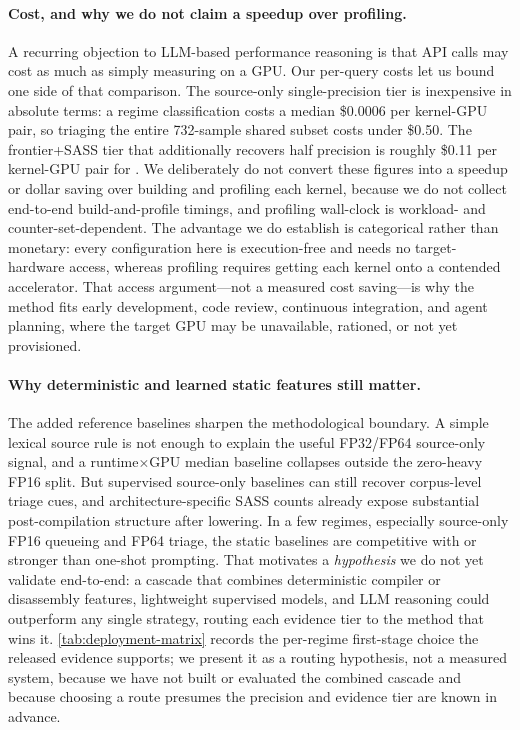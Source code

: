 \paragraph{Cost, and why we do not claim a speedup over profiling.}
A recurring objection to LLM-based performance reasoning is that API calls may cost as much as simply measuring on a GPU.
Our per-query costs let us bound one side of that comparison.
The source-only single-precision tier is inexpensive in absolute terms: a \gptoss regime classification costs a median \$0.0006 per kernel-GPU pair, so triaging the entire 732-sample shared subset costs under \$0.50.
The frontier+SASS tier that additionally recovers half precision is roughly \$0.11 per kernel-GPU pair for \opus.
We deliberately do not convert these figures into a speedup or dollar saving over building and profiling each kernel, because we do not collect end-to-end build-and-profile timings, and profiling wall-clock is workload- and counter-set-dependent.
The advantage we do establish is categorical rather than monetary: every configuration here is execution-free and needs no target-hardware access, whereas profiling requires getting each kernel onto a contended accelerator.
That access argument---not a measured cost saving---is why the method fits early development, code review, continuous integration, and agent planning, where the target GPU may be unavailable, rationed, or not yet provisioned.

\paragraph{Why deterministic and learned static features still matter.}
The added reference baselines sharpen the methodological boundary.
A simple lexical source rule is not enough to explain the useful FP32/FP64 source-only signal, and a runtime$\times$GPU median baseline collapses outside the zero-heavy FP16 split.
But supervised source-only baselines can still recover corpus-level triage cues, and architecture-specific SASS counts already expose substantial post-compilation structure after lowering.
In a few regimes, especially source-only FP16 queueing and \sourcesass FP64 triage, the static baselines are competitive with or stronger than one-shot prompting.
That motivates a \emph{hypothesis} we do not yet validate end-to-end:
a cascade that combines deterministic compiler or disassembly features, lightweight supervised models, and LLM reasoning could outperform any single strategy, routing each evidence tier to the method that wins it.
\autoref{tab:deployment-matrix} records the per-regime first-stage choice the released evidence supports; we present it as a routing hypothesis, not a measured system, because we have not built or evaluated the combined cascade and because choosing a route presumes the precision and evidence tier are known in advance.


